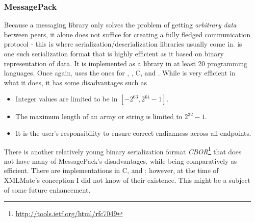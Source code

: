 \subsubsection{MessagePack}
Because a messaging library only solves the problem of getting \emph{arbitrary data} between peers, it 
alone does not suffice for creating a fully fledged communication protocol - this is where serialization/deserialization libraries 
usually come in. \msgpack\cite{msgpack} is one such serialization format that is highly efficient as it based on 
binary representation of data. It is implemented as a library in at least 20 programming languages. 
Once again, \xmlmate uses the ones for \java, \python, {\small C}, and \cpp.
While \msgpack is very efficient in what it does, it has some disadvantages such as 
\begin{itemize}
  \item Integer values are limited to be in $[-2^{63}, 2^{64}-1]$.
  \item The maximum length of an array or string is limited to $2^{32}-1$.
  \item It is the user's responsibility to ensure correct endianness across all endpoints.
\end{itemize}

There is another relatively young binary serialization format \emph{CBOR}\footnote{\url{http://tools.ietf.org/html/rfc7049}} 
that does not have many of {\small MessagePack's} disadvantages, while being comparatively as efficient.
There are implementations in {\small C}, \python and \java; however, at the time of {\small XMLMate's}
conception I did not know of their existence. This might be a subject of some future enhancement.
